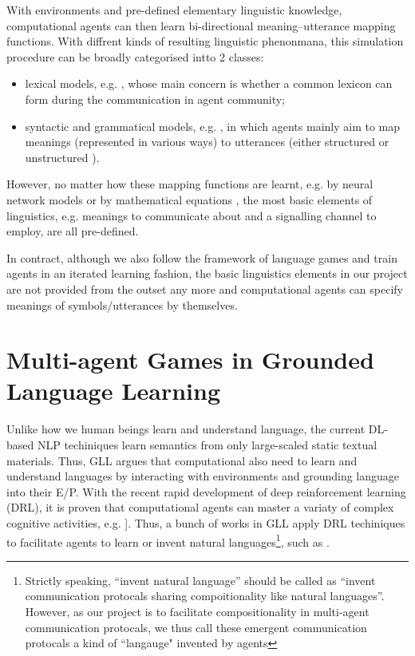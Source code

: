 \documentclass[msc,deptreport]{infthesis} %
\begin{document}
With environments and pre-defined elementary linguistic knowledge, computational agents can then learn bi-directional meaning–utterance mapping functions\cite{gong2013computer}. With diffrent kinds of resulting linguistic phenonmana, this simulation procedure can be broadly categorised intto 2 classes:
\begin{itemize}
  \item lexical models, e.g. \cite{steels2005emergence, baronchelli2006sharp, puglisi2008cultural}, whose main concern is whether a common lexicon can form during the communication in agent community;
  \item syntactic and grammatical models, e.g. \cite{kirby1999function, vogt2005acquisition}, in which agents mainly aim to map meanings (represented in various ways) to utterances (either structured or unstructured ).
\end{itemize}

However, no matter how these mapping functions are learnt, e.g. by neural network models \cite{munroe2002learning} or by mathematical equations \cite{minett2008modelling, ke2008language}, the most basic elements of linguistics, e.g. meanings to communicate about and a signalling channel to employ, are all pre-defined.

In contract, although we also follow the framework of language games and train agents in an iterated learning fashion, the basic linguistics elements in our project are not provided from the outset any more and computational agents can specify meanings of symbols/utterances by themselves.

\section{Multi-agent Games in Grounded Language Learning}
\label{sec2.2:gll}

Unlike how we human beings learn and understand language, the current DL-based NLP techiniques learn semantics from only large-scaled static textual materials. Thus, GLL argues that computational also need to learn and understand languages by interacting with environments and grounding language into their E/P. With the recent rapid development of deep reinforcement learning (DRL), it is proven that computational agents can master a variaty of complex cognitive activities, e.g. \cite{mnih2015human, silver2017mastering}]. Thus, a bunch of works in GLL apply DRL techiniques to facilitate agents to learn or invent natural languages\footnote{Strictly speaking, ``invent natural language'' should be called as ``invent communication protocals sharing compoitionality like natural languages''. However, as our project is to facilitate compositionality in multi-agent communication protocals, we thus call these emergent communication protocals a kind of ``langauge" invented by agents}, such as \cite{hermann2017grounded, mordatch2018emergence, havrylov2017emergence, hill2017understanding}.
\end{document}
